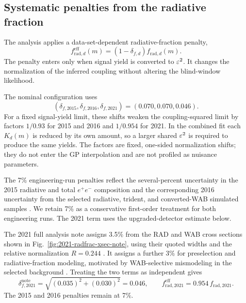 \subsection{Systematic penalties from the radiative fraction}
\label{sec:radfrac-penalty}

The analysis applies a data-set-dependent radiative-fraction penalty,
\begin{equation}
f_{\mathrm{rad},d}^{\mathrm{eff}}(m)
= \left(1-\delta_{f,d}\right) f_{\mathrm{rad},d}(m).
\label{eq:frad-penalty}
\end{equation}
The penalty enters only when signal yield is converted to $\varepsilon^2$. It changes the
normalization of the inferred coupling without altering the blind-window likelihood.

The nominal configuration uses
\begin{equation}
(\delta_{f,2015},\delta_{f,2016},\delta_{f,2021})=(0.070,0.070,0.046).
\label{eq:frad-penalty-vector}
\end{equation}
For a fixed signal-yield limit, these shifts weaken the coupling-squared limit by
factors $1/0.93$ for 2015 and 2016 and $1/0.954$ for 2021. In the combined fit each
$K_d(m)$ is reduced by its own amount, so a larger shared $\varepsilon^2$ is required to
produce the same yields. The factors are fixed, one-sided normalization shifts; they
do not enter the GP interpolation and are not profiled as nuisance parameters.

The 7\% engineering-run penalties reflect the several-percent uncertainty in the 2015
radiative and total $e^+e^-$ composition and the corresponding 2016 uncertainty from
the selected radiative, trident, and converted-WAB simulated samples
\cite{HPS2015InternalNote,HPS2016PromptLong}. We retain 7\% as a conservative
first-order treatment for both engineering runs. The 2021 term uses the
upgraded-detector estimate below.

The 2021 full analysis note assigns 3.5\% from the RAD and WAB cross sections shown in
Fig.~\ref{fig:2021-radfrac-xsec-note}, using their quoted widths and the relative
normalization $R=0.244$ \cite[Sec.~9.1, Fig.~161]{HPS2021FullAnalysisNote}. It assigns a
further 3\% for preselection and radiative-fraction modeling, motivated by
WAB-selective mismodeling in the selected background
\cite[Sec.~9.2]{HPS2021FullAnalysisNote}. Treating the two terms as independent gives
\begin{equation}
\delta_{f,2021}^{\mathrm{note}}
= \sqrt{(0.035)^2 + (0.030)^2}
= 0.046,
\qquad
f_{\mathrm{rad},2021}^{\mathrm{eff}}
= 0.954\,f_{\mathrm{rad},2021}.
\label{eq:frad-2021-note-penalty}
\end{equation}
The 2015 and 2016 penalties remain at 7\%.

